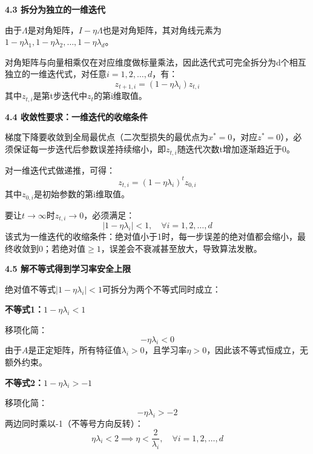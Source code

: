 \documentclass[10pt]{article}
\numberwithin{equation}{section}
\theoremstyle{plain}
\theoremstyle{definition}
\theoremstyle{remark}
\begin{document}
{\par\vspace{0.8ex}\noindent\normalsize\bfseries\color{secblue} 4.3 拆分为独立的一维迭代\par}
由于$\Lambda$是对角矩阵，$I - \eta \Lambda$也是对角矩阵，其对角线元素为$1 - \eta \lambda_1, 1 - \eta \lambda_2, \dots, 1 - \eta \lambda_d$。

对角矩阵与向量相乘仅在对应维度做标量乘法，因此迭代式可完全拆分为d个相互独立的一维迭代式，对任意$i=1,2,\dots,d$，有：
\[ z_{t+1,i} = (1 - \eta \lambda_i) z_{t,i} \]
其中$z_{t,i}$是第t步迭代中$z_t$的第i维取值。

{\par\vspace{0.8ex}\noindent\normalsize\bfseries\color{secblue} 4.4 收敛性要求：一维迭代的收缩条件\par}
梯度下降要收敛到全局最优点（二次型损失的最优点为$x^*=0$，对应$z^*=0$），必须保证每一步迭代后参数误差持续缩小，即$z_{t,i}$随迭代次数t增加逐渐趋近于0。

对一维迭代式做递推，可得：
\[ z_{t,i} = (1 - \eta \lambda_i)^t z_{0,i} \]
其中$z_{0,i}$是初始参数的第i维取值。

要让$t \to \infty$时$z_{t,i} \to 0$，必须满足：
\[ |1 - \eta \lambda_i| < 1, \quad \forall i = 1,2,\dots,d \]
该式为一维迭代的收缩条件：绝对值小于1时，每一步误差的绝对值都会缩小，最终收敛到0；若绝对值$\ge 1$，误差会不衰减甚至放大，导致算法发散。

{\par\vspace{0.8ex}\noindent\normalsize\bfseries\color{secblue} 4.5 解不等式得到学习率安全上限\par}
绝对值不等式$|1 - \eta \lambda_i| < 1$可拆分为两个不等式同时成立：

{\par\vspace{0.8ex}\noindent\normalsize\bfseries\color{secblue} 不等式1：$1 - \eta \lambda_i < 1$\par}
移项化简：
\[ -\eta \lambda_i < 0 \]
由于$A$是正定矩阵，所有特征值$\lambda_i > 0$，且学习率$\eta > 0$，因此该不等式恒成立，无额外约束。

{\par\vspace{0.8ex}\noindent\normalsize\bfseries\color{secblue} 不等式2：$1 - \eta \lambda_i > -1$\par}
移项化简：
\[ -\eta \lambda_i > -2 \]
两边同时乘以-1（不等号方向反转）：
\[ \eta \lambda_i < 2 \implies \eta < \frac{2}{\lambda_i}, \quad \forall i = 1,2,\dots,d \]
\end{document}
